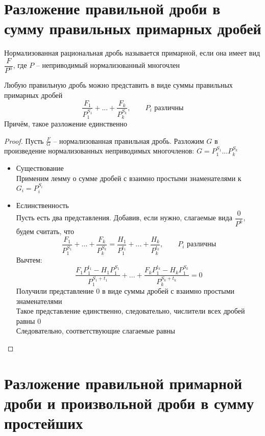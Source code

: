 \section{Разложение правильной дроби в сумму правильных примарных дробей}

\begin{definition}
	Нормализованная рациональная дробь называется примарной, если она имеет вид $\dfrac{F}{P^n}$, где $P$ -- неприводимый нормализованный многочлен
\end{definition}

\begin{lemma}
	Любую правильную дробь можно представить в виде суммы правильных примарных дробей
	$$ \frac{F_1}{P_1^{S_1}} + ... + \frac{F_k}{P_k^{S_k}}, \qquad P_i \text{ различны} $$
	Причём, такое разложение единственно
\end{lemma}

\begin{proof}
	Пусть $\frac{F}G$ -- нормализованная правильная дробь. Разложим $G$ в произведение нормализованных неприводимых многочленов: $G = P_1^{S_1}...P_k^{S_k} $
	\begin{itemize}
		\item Существование \\
		Применим лемму о сумме дробей с взаимно простыми знаменателями к $G_i = P_i^{S_i} $
		\item Еслинственность \\
		Пусть есть два представления. Добавив, если нужно, слагаемые вида $\dfrac{0}{P^k}$, будем считать, что
		$$ \frac{F_1}{P_1^{S_1}} + ... + \frac{F_k}{P_k^{S_k}} = \dfrac{H_1}{P_1^{t_1}} + ... + \frac{H_k}{P_k^{t_k}}, \qquad P_i \text{ различны} $$
		Вычтем:
		$$ \frac{F_1P_1^{t_1} - H_1P_1^{S_1}}{P_1^{S_1 + t_1}} + ... + \frac{F_kP_1^{t_k} - H_kP_1^{S_k}}{P_k^{S_k + t_k}} = 0 $$
		Получили представление 0 в виде суммы дробей с взаимно простыми знаменателями \\
		Такое представление единственно, следовательно, числители всех дробей равны 0 \\
		Следовательно, соответствующие слагаемые равны
	\end{itemize}
\end{proof}

\section{Разложение правильной примарной дроби и произвольной дроби в сумму простейших}

